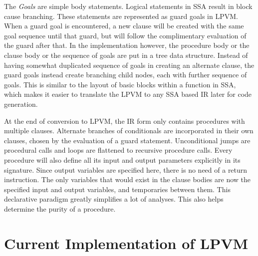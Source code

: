 The \textit{Goals} are simple body statements. Logical statements in SSA result
in block cause branching. These statements are represented as guard goals in
LPVM. When a guard goal is encountered, a new clause will be created with the
same goal sequence until that guard, but will follow the complimentary
evaluation of the guard after that. In the implementation however, the
procedure body or the clause body or the sequence of goals are put in a tree
data structure. Instead of having somewhat duplicated sequence of goals in
creating an alternate clause, the guard goals instead create branching child
nodes, each with further sequence of goals. This is similar to the layout of
basic blocks within a function in SSA, which makes it easier to translate the
LPVM to any SSA based IR later for code generation. 

At the end of conversion to LPVM, the IR form only contains procedures with
multiple clauses. Alternate branches of conditionals are incorporated in their
own clauses, chosen by the evaluation of a guard statement. Unconditional jumps
are procedural calls and loops are flattened to recursive procedure
calls. Every procedure will also define all its input and output parameters
explicitly in its signature. Since output variables are specified here, there
is no need of a return instruction. The only variables that would exist in the
clause bodies are now the specified input and output variables, and temporaries
between them. This declarative paradigm greatly simplifies a lot of
analyses. This also helps determine the purity of a procedure. 


\section{Current Implementation of LPVM}






